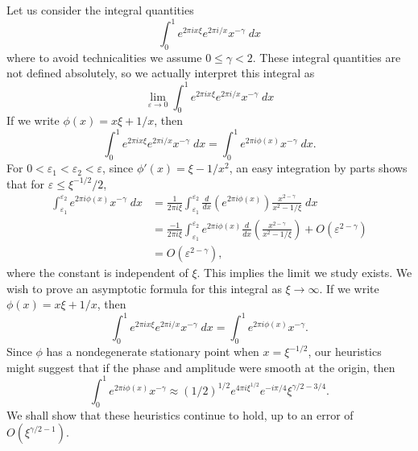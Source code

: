\begin{example}
  Let us consider the integral quantities
  \[ \int_0^1 e^{2 \pi i x \xi} e^{2 \pi i/x} x^{-\gamma}\; dx \]
  where to avoid technicalities we assume $0 \leq \gamma < 2$. These integral quantities are not defined absolutely, so we actually interpret this integral as
  \[ \lim_{\varepsilon \to 0} \int_0^1 e^{2 \pi i x \xi} e^{2 \pi i/x} x^{-\gamma}\; dx \]
  If we write $\phi(x) = x \xi + 1/x$, then
  \[ \int_0^1 e^{2 \pi i x \xi} e^{2 \pi i/x} x^{-\gamma}\; dx = \int_0^1 e^{2 \pi i \phi(x)} x^{-\gamma}\; dx. \]
  For $0 < \varepsilon_1 < \varepsilon_2 < \varepsilon$, since $\phi'(x) = \xi - 1/x^2$, an easy integration by parts shows that for $\varepsilon \leq \xi^{-1/2}/2$,
  \begin{equation} \label{riemannsingularityibp}
  \begin{aligned}
    \int_{\varepsilon_1}^{\varepsilon_2} e^{2 \pi i\phi(x)} x^{-\gamma}\; dx &= \frac{1}{2 \pi i \xi} \int_{\varepsilon_1}^{\varepsilon_2} \frac{d}{dx} \left( e^{2 \pi i \phi(x)} \right) \frac{x^{2-\gamma}}{x^2 - 1/\xi}\; dx\\
    &= \frac{-1}{2 \pi i \xi} \int_{\varepsilon_1}^{\varepsilon_2} e^{2 \pi i \phi(x)} \frac{d}{dx} \left( \frac{x^{2-\gamma}}{x^2 - 1/\xi} \right) + O(\varepsilon^{2-\gamma})\\
    &= O(\varepsilon^{2-\gamma}),
  \end{aligned}
  \end{equation}
  where the constant is independent of $\xi$. This implies the limit we study exists. We wish to prove an asymptotic formula for this integral as $\xi \to \infty$. If we write $\phi(x) = x \xi + 1/x$, then
  \[ \int_0^1 e^{2 \pi i x \xi} e^{2 \pi i/x} x^{-\gamma}\; dx = \int_0^1 e^{2 \pi i \phi(x)} x^{-\gamma}. \]
  Since $\phi$ has a nondegenerate stationary point when $x = \xi^{-1/2}$, our heuristics might suggest that if the phase and amplitude were smooth at the origin, then
  \[
    \int_0^1 e^{2 \pi i\phi(x)} x^{-\gamma} \approx (1/2)^{1/2} e^{4 \pi i \xi^{1/2}} e^{-i\pi/4} \xi^{\gamma/2-3/4}.
  \]
  We shall show that these heuristics continue to hold, up to an error of $O(\xi^{\gamma/2 - 1})$.


\end{example}
